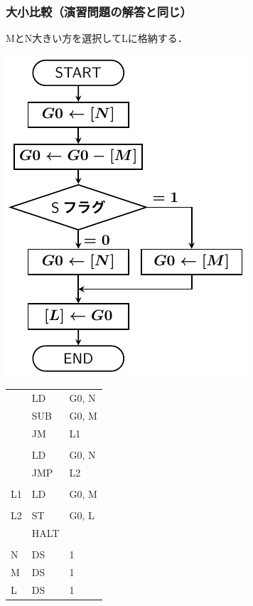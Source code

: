 \documentclass[handout]{beamer}        %
\begin{document}
\begin{frame}
  \frametitle{大小比較（演習問題の解答と同じ）}
  MとN大きい方を選択してLに格納する．\\
  \vfill
  \begin{minipage}{0.5\columnwidth}
    \centerline{\includegraphics[scale=0.75]{../Tikz/flowI.pdf}}
  \end{minipage}
  \begin{minipage}{0.48\columnwidth}
    {\ttfamily\footnotesize
      \begin{tabular}{|l|l|l|}
              & LD     & G0, N    \\
              & SUB    & G0, M    \\
              & JM     & L1       \\
              &        &          \\
              & LD     & G0, N    \\
              & JMP    & L2       \\
              &        &          \\
      L1      & LD     & G0, M    \\
              &        &          \\
      L2      & ST     & G0, L    \\
              & HALT   &          \\
              &        &          \\
      N       & DS     & 1        \\
      M       & DS     & 1        \\
      L       & DS     & 1        \\
    \end{tabular}}
    \vfill
  \end{minipage}
\end{frame}
\end{document}
